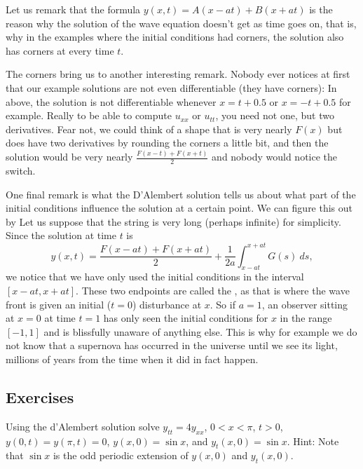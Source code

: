 Let us remark that the formula $y(x,t) = A(x-at) + B(x+at)$ is the reason
why the solution of the wave equation doesn't get  as time
goes on, that is, why in the examples where the initial conditions
had corners, the solution also has corners at every time $t$.

\medskip

The corners bring us to another interesting remark.  Nobody ever notices at first
that our example solutions are not even differentiable (they have corners):
In  above, the solution is not
differentiable whenever $x=t+0.5$ or $x=-t+0.5$ for example.
Really to be able to compute $u_{xx}$ or $u_{tt}$, you need not one, but two
derivatives.  Fear not, we could think of a shape that is very nearly
$F(x)$ but does have two derivatives by rounding the corners a little bit,
and then the solution would be very nearly
$\frac{F(x-t)+F(x+t)}{2}$ and nobody would notice the switch.

\medskip

One final remark is what the D'Alembert solution tells us about what
part of the initial conditions influence the solution at a certain point.
We can figure this out by   Let us suppose that the string is very long (perhaps
infinite) for simplicity.  Since the solution at time $t$ is
\begin{equation*}
y(x,t) =
\frac{F(x-at) + F(x+at)}{2} + \frac{1}{2a} \int_{x-at}^{x+at} G(s) ~ds ,
\end{equation*}
we notice that we have only used the initial conditions in the interval
$[x-at,x+at]$.  These two endpoints are called the
\emph{}, as that is where the wave front is given an
initial ($t=0$) disturbance at $x$.
So if $a=1$, an observer sitting at $x=0$ at time $t=1$ has only seen the
initial conditions for $x$ in the range $[-1,1]$
and is blissfully unaware of anything else.
This is why for example we do not know that a supernova has occurred in the
universe until we see its light, millions of years from the time
when it did in fact happen.

\subsection{Exercises}

\begin{exercise}
Using the d'Alembert solution solve $y_{tt} = 4y_{xx}$, $0 < x < \pi$, $t >
0$,
$y(0,t) = y(\pi, t) = 0$, $y(x,0) = \sin x$, and
$y_t(x,0) = \sin x$.  Hint: Note that $\sin x$ is the odd periodic extension of
$y(x,0)$ and $y_t(x,0)$.
\end{exercise}

